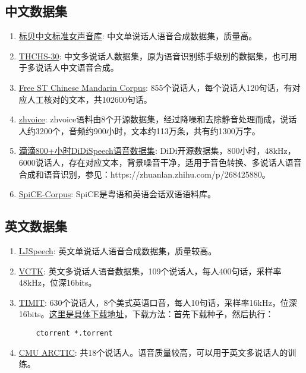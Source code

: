 \documentclass[cn,10pt,math=newtx,citestyle=gb7714-2015,bibstyle=gb7714-2015]{elegantbook}
\begin{document}
\subsection{中文数据集}
\begin{enumerate}
  \item \href{https://www.data-baker.com/open_source.html}{标贝中文标准女声音库}: 中文单说话人语音合成数据集，质量高。
  \item \href{https://www.openslr.org/18/}{THCHS-30}: 中文多说话人数据集，原为语音识别练手级别的数据集，也可用于多说话人中文语音合成。
  \item \href{https://www.openslr.org/38/}{Free ST Chinese Mandarin Corpus}: 855个说话人，每个说话人120句话，有对应人工核对的文本，共102600句话。
  \item \href{https://github.com/KuangDD/zhvoice}{zhvoice}: zhvoice语料由8个开源数据集，经过降噪和去除静音处理而成，说话人约3200个，音频约900小时，文本约113万条，共有约1300万字。
  \item \href{https://arxiv.org/abs/2010.09275}{滴滴800+小时DiDiSpeech语音数据集}: DiDi开源数据集，800小时，48kHz，6000说话人，存在对应文本，背景噪音干净，适用于音色转换、多说话人语音合成和语音识别，参见：https://zhuanlan.zhihu.com/p/268425880。
  \item \href{https://github.com/khiajohnson/SpiCE-Corpus}{SpiCE-Corpus}: SpiCE是粤语和英语会话双语语料库。
\end{enumerate}

\subsection{英文数据集}
\begin{enumerate}
  \item \href{https://keithito.com/LJ-Speech-Dataset/}{LJSpeech}: 英文单说话人语音合成数据集，质量较高。
  \item \href{https://datashare.is.ed.ac.uk/handle/10283/2651}{VCTK}: 英文多说话人语音数据集，109个说话人，每人400句话，采样率48kHz，位深16bits。
  \item \href{https://catalog.ldc.upenn.edu/LDC93S1}{TIMIT}: 630个说话人，8个美式英语口音，每人10句话，采样率16kHz，位深16bits。\href{http://academictorrents.com/details/34e2b78745138186976cbc27939b1b34d18bd5b3}{这里是具体下载地址}，下载方法：首先下载种子，然后执行：
  \begin{lstlisting}
    ctorrent *.torrent
  \end{lstlisting}

  \item \href{http://festvox.org/cmu_arctic/packed/}{CMU ARCTIC}: 共18个说话人。语音质量较高，可以用于英文多说话人的训练。

\end{enumerate}
\end{document}
